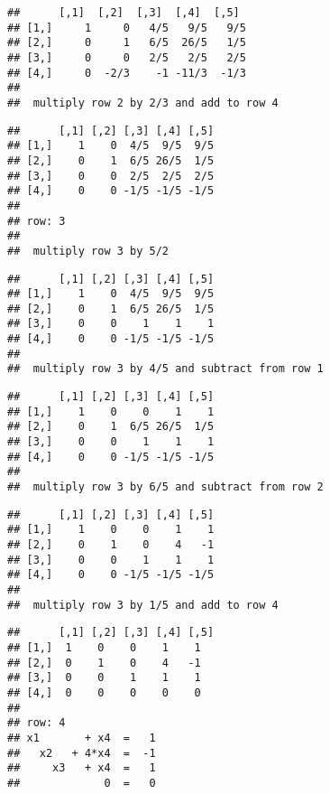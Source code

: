 \documentclass[
  10pt,
  a4paper,
]{article}
\begin{document}
\begin{verbatim}
##      [,1]  [,2]  [,3]  [,4]  [,5] 
## [1,]     1     0   4/5   9/5   9/5
## [2,]     0     1   6/5  26/5   1/5
## [3,]     0     0   2/5   2/5   2/5
## [4,]     0  -2/3    -1 -11/3  -1/3
## 
##  multiply row 2 by 2/3 and add to row 4
\end{verbatim}

\begin{verbatim}
##      [,1] [,2] [,3] [,4] [,5]
## [1,]    1    0  4/5  9/5  9/5
## [2,]    0    1  6/5 26/5  1/5
## [3,]    0    0  2/5  2/5  2/5
## [4,]    0    0 -1/5 -1/5 -1/5
## 
## row: 3 
## 
##  multiply row 3 by 5/2
\end{verbatim}

\begin{verbatim}
##      [,1] [,2] [,3] [,4] [,5]
## [1,]    1    0  4/5  9/5  9/5
## [2,]    0    1  6/5 26/5  1/5
## [3,]    0    0    1    1    1
## [4,]    0    0 -1/5 -1/5 -1/5
## 
##  multiply row 3 by 4/5 and subtract from row 1
\end{verbatim}

\begin{verbatim}
##      [,1] [,2] [,3] [,4] [,5]
## [1,]    1    0    0    1    1
## [2,]    0    1  6/5 26/5  1/5
## [3,]    0    0    1    1    1
## [4,]    0    0 -1/5 -1/5 -1/5
## 
##  multiply row 3 by 6/5 and subtract from row 2
\end{verbatim}

\begin{verbatim}
##      [,1] [,2] [,3] [,4] [,5]
## [1,]    1    0    0    1    1
## [2,]    0    1    0    4   -1
## [3,]    0    0    1    1    1
## [4,]    0    0 -1/5 -1/5 -1/5
## 
##  multiply row 3 by 1/5 and add to row 4
\end{verbatim}

\begin{verbatim}
##      [,1] [,2] [,3] [,4] [,5]
## [1,]  1    0    0    1    1  
## [2,]  0    1    0    4   -1  
## [3,]  0    0    1    1    1  
## [4,]  0    0    0    0    0  
## 
## row: 4 
## x1       + x4  =   1 
##   x2   + 4*x4  =  -1 
##     x3   + x4  =   1 
##             0  =   0
\end{verbatim}
\end{document}
